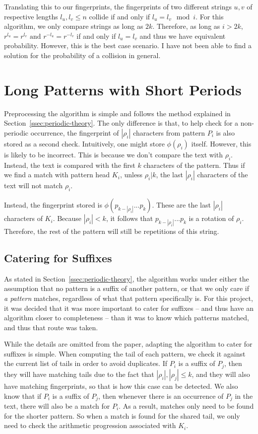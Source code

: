 \documentclass[ %
                    author={Dominic Joseph Moylett},
                    degree={MEng},
                     title={Dictionary Matching with Fingerprints},
                  subtitle={An Empirical Analysis},
                      type={research},
                      year={2015} ]{dissertation}
\begin{document}
Translating this to our fingerprints, the fingerprints of two different strings $u, v$ of respective lengths $l_u, l_v \leq n$ collide if and only if $l_u = l_v \mod i$. For this algorithm, we only compare strings as long as $2k$. Therefore, as long as $i > 2k$, $r^{l_u} = r^{l_v} \text{ and } r^{-l_u} = r^{-l_v}$ if and only if $l_u = l_v$ and thus we have equivalent probability. However, this is the best case scenario. I have not been able to find a solution for the probability of a collision in general.

\section{Long Patterns with Short Periods}
\label{sec:impl-periodic}

Preprocessing the algorithm is simple and follows the method explained in Section~\ref{ssec:periodic-theory}. The only difference is that, to help check for a non-periodic occurrence, the fingerprint of $|\rho_i|$ characters from pattern $P_i$ is also stored as a second check. Intuitively, one might store $\phi(\rho_i)$ itself. However, this is likely to be incorrect. This is because we don't compare the text with $\rho_i$. Instead, the text is compared with the first $k$ characters of the pattern. Thus if we find a match with pattern head $K_i$, unless $\rho_i | k$, the last $|\rho_i|$ characters of the text will not match $\rho_i$.

Instead, the fingerprint stored is $\phi(p_{k - |\rho_i|}...p_k)$. These are the last $|\rho_i|$ characters of $K_i$. Because $|\rho_i| < k$, it follows that $p_{k - |\rho_i|}...p_k$ is a rotation of $\rho_i$. Therefore, the rest of the pattern will still be repetitions of this string.

\subsection{Catering for Suffixes}

As stated in Section~\ref{ssec:periodic-theory}, the algorithm works under either the assumption that no pattern is a suffix of another pattern, or that we only care if \textit{a pattern} matches, regardless of what that pattern specifically is. For this project, it was decided that it was more important to cater for suffixes -- and thus have an algorithm closer to completeness -- than it was to know which patterns matched, and thus that route was taken.

While the details are omitted from the paper, adapting the algorithm to cater for suffixes is simple. When computing the tail of each pattern, we check it against the current list of tails in order to avoid duplicates. If $P_i$ is a suffix of $P_j$, then they will have matching tails due to the fact that $|\rho_i|, |\rho_j| \leq k$, and they will also have matching fingerprints, so that is how this case can be detected. We also know that if $P_i$ is a suffix of $P_j$, then whenever there is an occurrence of $P_j$ in the text, there will also be a match for $P_i$. As a result, matches only need to be found for the shorter pattern. So when a match is found for the shared tail, we only need to check the arithmetic progression associated with $K_i$.
\end{document}
